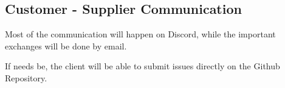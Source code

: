 \documentclass{beamer}
\begin{document}
\subsection{Customer - Supplier Communication}
\begin{frame}
    Most of the communication will happen on Discord, while the important exchanges will be done by email.

    \vspace*{5mm}

    If needs be, the client will be able to submit issues directly on the Github Repository.
\end{frame}
\end{document}
